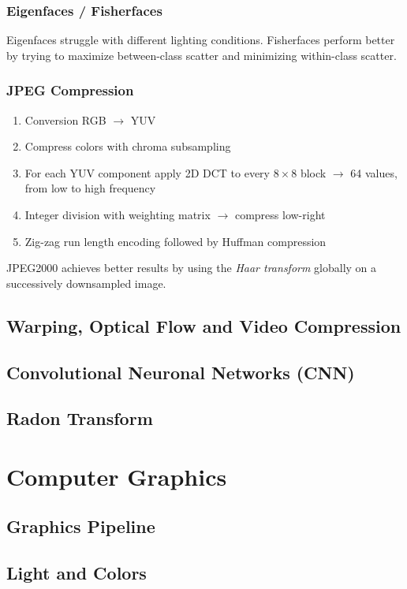 \documentclass[a4paper,10pt]{article}
\begin{document}
\subsubsection{Eigenfaces / Fisherfaces}
Eigenfaces struggle with different lighting conditions. Fisherfaces perform better by trying to maximize between-class scatter and minimizing within-class scatter.

\subsubsection{JPEG Compression}
\begin{enumerate}
    \item Conversion RGB \(\to\) YUV
    \item Compress colors with chroma subsampling
    \item For each YUV component apply 2D DCT to every \(8 \times 8\) block \(\rightarrow\) 64 values, from low to high frequency
    \item Integer division with weighting matrix \(\rightarrow\) compress low-right
    \item Zig-zag run length encoding followed by Huffman compression
\end{enumerate}
JPEG2000 achieves better results by using the \emph{Haar transform} globally on a successively downsampled image.

\subsection{Warping, Optical Flow and Video Compression}
\subsection{Convolutional Neuronal Networks (CNN)}
\subsection{Radon Transform}
\section{Computer Graphics}
\subsection{Graphics Pipeline}
\subsection{Light and Colors}
\end{document}

